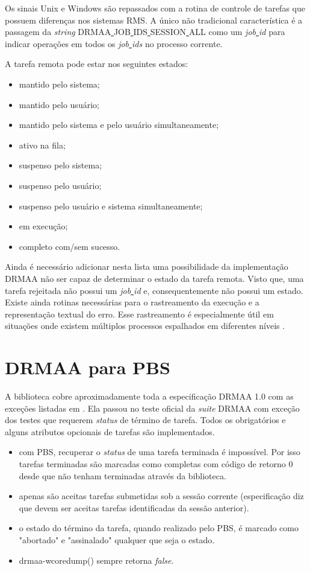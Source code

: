Os sinais Unix e Windows são repassados com a rotina de controle de tarefas que possuem diferenças nos sistemas RMS. A único não tradicional característica é a passagem da \emph{string} DRMAA\underline{ }JOB\underline{ }IDS\underline{ }SESSION\underline{ }ALL como um \emph{job\underline{ }id} para indicar operações em todos os \emph{job\underline{ }ids} no processo corrente.

A tarefa remota pode estar nos seguintes estados:
\begin{itemize}
	\item mantido pelo sistema;
	\item mantido pelo usuário;
	\item mantido pelo sistema e pelo usuário simultaneamente;
	\item ativo na fila;
	\item suspenso pelo sistema;
	\item suspenso pelo usuário;
	\item suspenso pelo usuário e sistema simultaneamente;
	\item em execução;
	\item completo com/sem sucesso.
\end{itemize}

Ainda é necessário adicionar nesta lista uma possibilidade da implementação DRMAA não ser capaz de determinar o estado da tarefa remota. Visto que, uma tarefa rejeitada não possui um \emph{job\underline{ }id} e, consequentemente não possui um estado. Existe ainda rotinas necessárias para o rastreamento da execução e a representação textual do erro. Esse rastreamento é especialmente útil em situações onde existem múltiplos processos espalhados em diferentes níveis \cite{Rajic2002}.  

\section{DRMAA para PBS}

A biblioteca cobre aproximadamente toda a especificação DRMAA 1.0 com as exceções listadas em \cite{drmaa_pbs}. Ela passou no teste oficial da \emph{suite} DRMAA com exceção dos testes que requerem \emph{status} de término de tarefa. Todos os obrigatórios e alguns atributos opcionais de tarefas são implementados.

\begin{itemize}
	\item com PBS, recuperar o \emph{status} de uma tarefa terminada é impossível. Por isso tarefas terminadas são marcadas como completas com código de retorno 0 desde que não tenham terminadas através da biblioteca.
	\item apenas são aceitas tarefas submetidas sob a sessão corrente (especificação diz que devem ser aceitas tarefas identificadas da sessão anterior).
	\item o estado do término da tarefa, quando realizado pelo PBS, é marcado como "abortado"  e  "assinalado"  qualquer que seja o estado.
	\item drmaa-wcoredump() sempre retorna \emph{false}.
\end{itemize}


